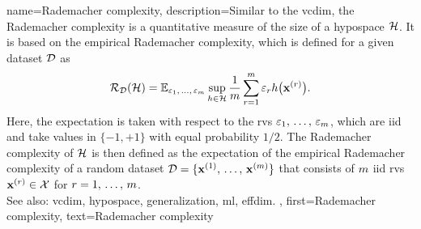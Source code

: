 {name={Rademacher complexity},
 	description={Similar to the \gls{vcdim}, the Rademacher 
		complexity \cite{bartlett2002rademacher} is a quantitative \gls{measure} 
		of the size of a \gls{hypospace} $\mathcal{H}$. It is based on the 
		empirical Rademacher complexity, which is defined for a given \gls{dataset} 
		$\mathcal{D}$ as
		\begin{equation}
			\nonumber
    			\mathcal{R}_{\mathcal{D}}(\mathcal{H}) 
    			= 
    			\mathbb{E}_{\varepsilon_{1},\,\ldots,\,\varepsilon_{m} } 
			\sup_{h \in \mathcal{H}} \frac{1}{m} \sum_{r=1}^m \varepsilon_r 
			h\big({\bf x}^{(r)} \big).
    		\end{equation}
		Here, the \gls{expectation} is taken with respect to 
		the \glspl{rv} $\varepsilon_{1},\,\ldots,\,\varepsilon_{m}$,
		which are \gls{iid} and take values in $\{ -1, +1 \}$ with equal 
		\gls{probability} $1/2$. The Rademacher complexity of $\mathcal{H}$ is 
		then defined as the \gls{expectation} of the empirical Rademacher complexity 
		of a random \gls{dataset} $\mathcal{D} = \{{\bf x}^{(1)}, \,\hdots, \,{\bf x}^{(m)}\}$
		that consists of $m$ \gls{iid} \glspl{rv} ${\bf x}^{(r)} \in \mathcal{X}$ 
		for $r=1,\,\ldots,\,m$.  
		\\
        		See also: \gls{vcdim}, \gls{hypospace}, \gls{generalization}, \gls{ml}, \gls{effdim}. },
	first={Rademacher complexity},
	text={Rademacher complexity}  
}

